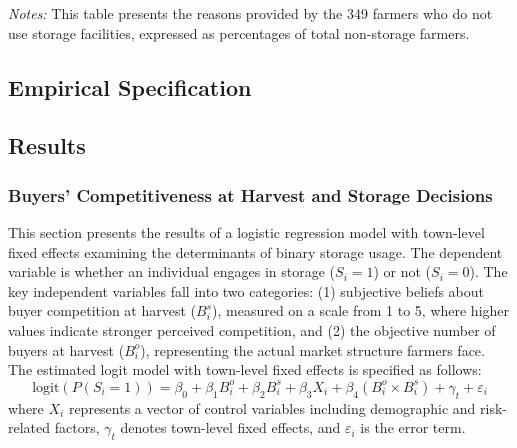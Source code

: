 \documentclass[12pt]{article}
\begin{document}
\begin{table}[H]
    \centering
    \footnotesize
    \caption{Reasons for Not Using Storage Facilities}
    \label{tab:non_storage_reasons}
        \begin{tablenotes}
            \item \textit{Notes:} This table presents the reasons provided by the 349 farmers who do not use storage facilities, expressed as percentages of total non-storage farmers.
        \end{tablenotes}
\end{table}


\newpage
\subsection{Empirical Specification}




\subsection{Results}
\subsubsection{Buyers' Competitiveness at Harvest and Storage Decisions}
This section presents the results of a logistic regression model with town-level fixed effects examining the determinants of binary storage usage. The dependent variable is whether an individual engages in storage ($S_i = 1$) or not ($S_i = 0$). The key independent variables fall into two categories: (1) subjective beliefs about buyer competition at harvest ($B^s_i$), measured on a scale from 1 to 5, where higher values indicate stronger perceived competition, and (2) the objective number of buyers at harvest ($B^o_i$), representing the actual market structure farmers face. The estimated logit model with town-level fixed effects is specified as follows:
\begin{equation}
\text{logit} \left( P(S_i = 1) \right) = \beta_0 + \beta_1 B^o_i + \beta_2 B^s_i + \beta_3 X_i + \beta_4 (B^o_i \times B^s_i) + \gamma_t + \varepsilon_i
\end{equation}
where $X_i$ represents a vector of control variables including demographic and risk-related factors, $\gamma_t$ denotes town-level fixed effects, and $\varepsilon_i$ is the error term.
\end{document}
